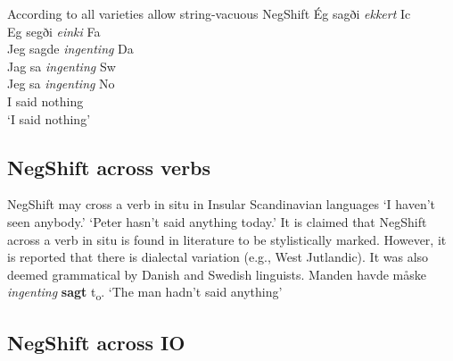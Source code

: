 \documentclass[12pt, letterpaper]{article}
\begin{document}
\ea According to \citeauthor{engelsScandinavianNegativeIndefinites2012} all varieties allow string-vacuous NegShift
	\ea 
	\gllllll Ég sagði \textit{ekkert}  Ic\\
			Eg segði \textit{einki}  Fa\\
			Jeg sagde \textit{ingenting}  Da \\
			Jag sa \textit{ingenting}  Sw\\
			Jeg sa \textit{ingenting}  No\\
			I said nothing\\
	\glt `I said nothing'
	\z 
\z

\subsection{NegShift across verbs}

\ea NegShift may cross a verb in situ in Insular Scandinavian languages
	\glt `I haven't seen anybody.'%
	\glt `Peter hasn't said anything today.'%
	\z 
\ex It is claimed that NegShift across a verb in situ is found in literature to be stylistically marked. However, it is reported that there is dialectal variation (e.g., West Jutlandic). It was also deemed grammatical by Danish and Swedish linguists.
	\ea Manden havde måske \textit{ingenting} \textbf{sagt} t\textsubscript{o}.
	\glt `The man hadn't said anything'
	\z 
\z 

\subsection{NegShift across IO}
\end{document}
